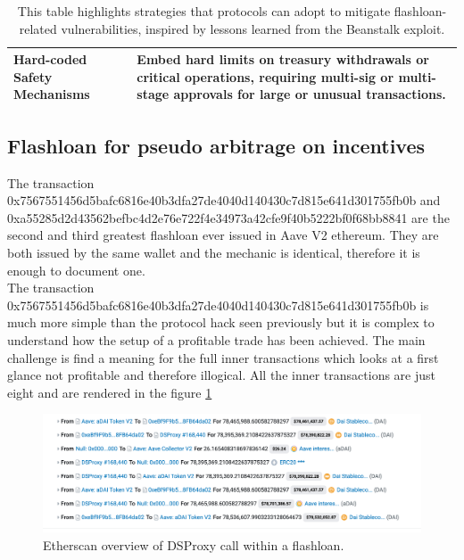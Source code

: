 \documentclass[11pt,a4paper,titlepage]{scrartcl}
\begin{document}
\begin{table}[H]
{\begin{tabular}{|l|p{}|}
\textbf{Hard-coded Safety Mechanisms} & 
Embed hard limits on treasury withdrawals or critical operations, requiring multi-sig or multi-stage approvals for large or unusual transactions. \\ \hline

\end{tabular}%
}
\captionsetup{font=footnotesize, justification=centering}
\caption*{\footnotesize This table highlights strategies that protocols can adopt to mitigate flashloan-related vulnerabilities, inspired by lessons learned from the Beanstalk exploit.}
\label{tab:flashloan_mitigation}
\end{table} 
 
\subsection{Flashloan for pseudo arbitrage on incentives}

The transaction 0x7567551456d5bafc6816e40b3dfa27de4040d140430c7d815e641d301755fb0b and 0xa55285d2d43562befbc4d2e76e722f4e34973a42cfe9f40b5222bf0f68bb8841 are the second and third greatest flashloan ever issued in Aave V2 ethereum. They are both issued by the same wallet and the mechanic is identical, therefore it is enough to document one. \\
 The transaction 0x7567551456d5bafc6816e40b3dfa27de4040d140430c7d815e641d301755fb0b is much more simple than the protocol hack seen previously but it is complex to understand how the setup of a profitable trade has been achieved. The main challenge is find a meaning for the full inner transactions which looks at a first glance not profitable and therefore illogical. All the inner transactions are just eight and are rendered in the figure   \ref{fig:humphy1} 

\begin{figure}[ht]
    \centering %
    \includegraphics[width=\textwidth, keepaspectratio]{image/humpyDSProxy/innerTxHumphy.png}
    \caption{Etherscan overview of DSProxy call within a flashloan.}
    \label{fig:humphy1}
\end{figure}
\end{document}
